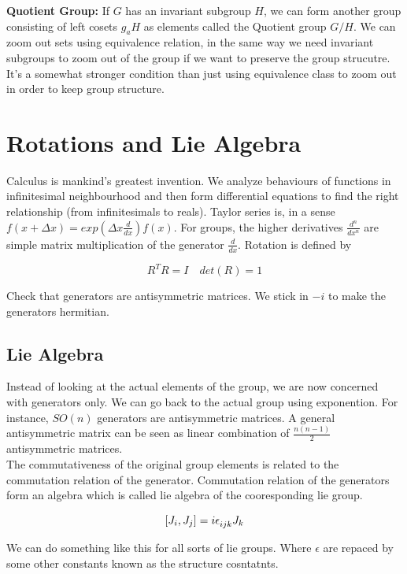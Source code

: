 \documentclass{report}
\begin{document}
\noindent\textbf{Quotient Group:} If $G$ has an invariant subgroup $H$, we can form another group consisting of left cosets $g_aH$ as elements called the Quotient group $G/H$. We can zoom out sets using equivalence relation, in the same way we need invariant subgroups to zoom out of the group if we want to preserve the group strucutre. It's a somewhat stronger condition than just using equivalence class to zoom out in order to keep group structure. \\

\section{Rotations and Lie Algebra}

Calculus is mankind's greatest invention. We analyze behaviours of functions in infinitesimal neighbourhood and then form differential equations to find the right relationship (from infinitesimals to reals). Taylor series is, in a sense $f(x+\Delta x) = exp(\Delta x\frac{d}{dx})f(x)$. For groups, the higher derivatives $\frac{d^n}{dx^n}$ are simple matrix multiplication of the generator $\frac{d}{dx}$. Rotation is defined by

$$R^{T}R = I \quad det(R) = 1$$

\noindent Check that generators are antisymmetric matrices. We stick in $-i$ to make the generators hermitian.

\subsection{Lie Algebra}

Instead of looking at the actual elements of the group, we are now concerned with generators only. We can go back to the actual group using exponention. For instance, $SO(n)$ generators are antisymmetric matrices. A general antisymmetric matrix can be seen as linear combination of $\frac{n(n-1)}{2}$ antisymmetric matrices. \\

\noindent The commutativeness of the original group elements is related to the commutation relation of the generator. Commutation relation of the generators form an algebra which is called lie algebra of the cooresponding lie group.

$$[J_i, J_j] = i\epsilon\indices{_i_j_k}J_k$$

\noindent We can do something like this for all sorts of lie groups. Where $\epsilon$ are repaced by some other constants known as the structure cosntatnts.
\end{document}
